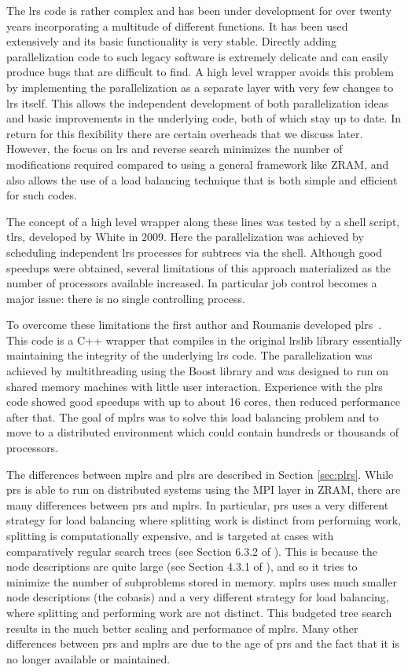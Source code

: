 \documentclass[a4paper,11pt]{article}   \usepackage{authblk} \usepackage[top=1.9cm,bottom=1.9cm,left=1.9cm,right=1.9cm]{geometry}
\newcommand{\progname}{\textsf}
\newcommand{\zram}{\progname{ZRAM}\xspace}
\newcommand{\prs}{\progname{prs}\xspace}
\newcommand{\lrs}{\progname{lrs}\xspace}
\newcommand{\plrs}{\progname{plrs}\xspace}
\newcommand{\mplrs}{\progname{mplrs}\xspace}
\newcommand{\lrslib}{\progname{lrslib}\xspace}
\begin{document}
The \lrs code is rather complex and has been under development for over twenty
years incorporating a multitude of different functions. It has been used
extensively and its basic functionality is very stable. Directly adding parallelization code
to such legacy software is extremely delicate and can easily produce bugs that
are difficult to find. A high level wrapper avoids this problem by implementing the parallelization
as a separate layer with very few changes to \lrs itself.
This allows the independent development of both parallelization
ideas and basic improvements in the underlying code, both of which stay up to date.
In return for this flexibility there are certain overheads that we discuss later.
However, the focus on \lrs and reverse search minimizes the number of modifications required
compared to using a general framework like \zram, and also allows the use of a load balancing technique
that is both simple and efficient for such codes.

The concept of a high level wrapper along these lines was tested by a shell
script, \progname{tlrs}, developed by White in 2009. Here the parallelization was achieved
by scheduling independent \lrs processes for subtrees via the shell. Although good speedups were obtained,
several limitations of this approach materialized as the number of processors available increased.
In particular job control becomes a major issue: there is no single controlling process.

To overcome these limitations the first author and Roumanis developed \plrs~\cite{AR13}.
This code is a C++ wrapper that compiles in the original \lrslib library essentially maintaining
the integrity of the underlying \lrs code. The parallelization was achieved by multithreading
using the Boost library and was designed to run on shared memory machines with little user interaction.
Experience with the \plrs
code showed good speedups with up to about 16 cores, then reduced
performance after that. 
The goal of \mplrs was to solve this load balancing problem and to move to a distributed
environment which could contain hundreds or thousands of processors.

The differences between \mplrs and \plrs are described in Section \ref{sec:plrs}.  While \prs
is able to run on distributed systems using the MPI layer in \zram, there are many differences
between \prs and \mplrs.  In particular, \prs uses a very different strategy for load balancing
where splitting work is distinct from performing work, splitting is computationally expensive, and
is targeted at cases with comparatively regular search trees (see Section 6.3.2 of \cite{ZRAMthesis}).
This is because the node descriptions are quite large (see Section 4.3.1 of \cite{ZRAMthesis}), and so
it tries to minimize the number of subproblems stored in memory.  \mplrs uses much smaller node descriptions (the cobasis)
and a very different strategy for load balancing, where splitting and performing work are not distinct.
This budgeted tree search results in the much better scaling and performance of \mplrs.
Many other differences between \prs and \mplrs are due to the age of \prs and 
the fact that it is no longer available or maintained.
\end{document}

